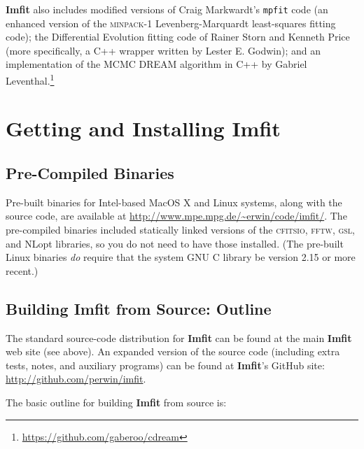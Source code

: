 \documentclass[10pt,a4paper,article]{memoir}
\newcommand{\Imfit}{\textbf{Imfit}}
\begin{document}
\bigskip

\Imfit{} also includes modified versions of Craig Markwardt's
\texttt{mpfit} code (an enhanced version of the \textsc{minpack-1}
Levenberg-Marquardt least-squares fitting code); the Differential
Evolution fitting code of Rainer Storn and Kenneth Price (more
specifically, a C++ wrapper written by Lester E. Godwin); and
an implementation of the MCMC DREAM algorithm in C++ by Gabriel 
Leventhal.\footnote{\url{https://github.com/gaberoo/cdream}}



\newpage

\chapter{Getting and Installing \Imfit{}}

\section{Pre-Compiled Binaries}

Pre-built binaries for Intel-based MacOS X and Linux systems, along with
the source code, are available at
\url{http://www.mpe.mpg.de/~erwin/code/imfit/}. The pre-compiled
binaries included statically linked versions of the \textsc{cfitsio},
\textsc{fftw}, \textsc{gsl}, and NLopt libraries, so you do not need to
have those installed. (The pre-built Linux binaries \textit{do} require
that the system GNU C library be version 2.15 or more recent.)


\section{Building \Imfit{} from Source: Outline}

The standard source-code distribution for \Imfit{} can be found at the
main \Imfit{} web site (see above). An expanded version of the source code
(including extra tests, notes, and auxiliary programs) can be found at
\Imfit's GitHub site: \url{http://github.com/perwin/imfit}.

The basic outline for building \Imfit{} from source is:
\end{document}
